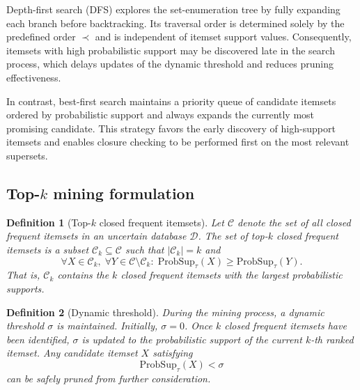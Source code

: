 \documentclass[10pt,letterpaper]{article}
\newtheorem{definition}{Definition}[section]
\newcounter{definition}
\begin{document}
Depth-first search (DFS) explores the set-enumeration tree by fully expanding each branch before backtracking. Its traversal order is determined solely by the predefined order $\prec$ and is independent of itemset support values. Consequently, itemsets with high probabilistic support may be discovered late in the search process, which delays updates of the dynamic threshold and reduces pruning effectiveness.

In contrast, best-first search maintains a priority queue of candidate itemsets ordered by probabilistic support and always expands the currently most promising candidate. This strategy favors the early discovery of high-support itemsets and enables closure checking to be performed first on the most relevant supersets.

\subsection*{Top-$k$ mining formulation}
\label{subsec:topk_formulation}

\begin{definition}[Top-$k$ closed frequent itemsets]
\label{def:topk}
Let $\mathcal{C}$ denote the set of all closed frequent itemsets in an uncertain database $\mathcal{D}$.  
The set of top-$k$ closed frequent itemsets is a subset $\mathcal{C}_k \subseteq \mathcal{C}$ such that $|\mathcal{C}_k| = k$ and
\begin{equation}
\forall X \in \mathcal{C}_k,\; \forall Y \in \mathcal{C} \setminus \mathcal{C}_k:\;
\mathrm{ProbSup}_{\tau}(X) \geq \mathrm{ProbSup}_{\tau}(Y).
\label{eq:topk_def}
\end{equation}
That is, $\mathcal{C}_k$ contains the $k$ closed frequent itemsets with the largest probabilistic supports.
\end{definition}

\begin{definition}[Dynamic threshold]
\label{def:dyn_threshold}
During the mining process, a dynamic threshold $\sigma$ is maintained. Initially, $\sigma = 0$.  
Once $k$ closed frequent itemsets have been identified, $\sigma$ is updated to the probabilistic support of the current $k$-th ranked itemset.  
Any candidate itemset $X$ satisfying
\begin{equation}
\mathrm{ProbSup}_{\tau}(X) < \sigma
\label{eq:threshold_prune}
\end{equation}
can be safely pruned from further consideration.
\end{definition}
\end{document}
